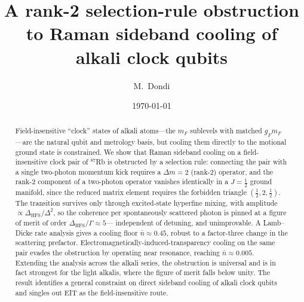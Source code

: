 \documentclass[aps,pra,reprint,amsmath,amssymb,superscriptaddress,floatfix]{revtex4-2}
\newcommand{\nbar}{\bar n}
\newcommand{\Dm}{\Delta m}
\newcommand{\dhfs}{\Delta_{\mathrm{HFS}}}
\begin{document}
\title{A rank-2 selection-rule obstruction to Raman sideband cooling of alkali clock qubits}

\author{M.~Dondi}

\date{\today}

\begin{abstract}
Field-insensitive ``clock'' states of alkali atoms---the $m_F$ sublevels with matched
$g_F m_F$---are the natural qubit and metrology basis, but cooling them directly to the motional
ground state is constrained. We show that Raman sideband cooling on a field-insensitive clock pair
of $^{87}$Rb is obstructed by a selection rule: connecting the pair with a single two-photon
momentum kick requires a $\Dm=2$ (rank-2) operator, and the rank-2 component of a two-photon
operator vanishes identically in a $J=\tfrac12$ ground manifold, since the reduced matrix element
requires the forbidden triangle $(\tfrac12,2,\tfrac12)$. The transition survives only through
excited-state hyperfine mixing, with amplitude $\propto\dhfs/\Delta^2$, so the coherence per
spontaneously scattered photon is pinned at a figure of merit of order $\dhfs/\Gamma\approx5$---
independent of detuning, and unimprovable. A Lamb--Dicke rate analysis gives a cooling floor
$\nbar\approx0.45$, robust to a factor-three change in the scattering prefactor.
Electromagnetically-induced-transparency cooling on the same pair evades the obstruction by
operating near resonance, reaching $\nbar\approx0.005$. Extending the analysis across the alkali
series, the obstruction is universal and is in fact strongest for the light alkalis, where the
figure of merit falls below unity. The result identifies a general constraint on direct sideband
cooling of alkali clock qubits and singles out EIT as the field-insensitive route.
\end{abstract}

\maketitle

\end{document}
